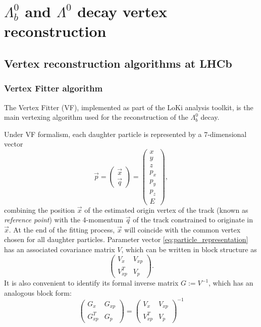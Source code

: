 \chapter{\texorpdfstring{$\Lambda_b^0$}{Lambdab} and \texorpdfstring{$\Lambda^0$}{Lambda} decay vertex reconstruction}
\label{cap:vertex_reconstruction}

\section{Vertex reconstruction algorithms at LHCb}
\subsection{Vertex Fitter algorithm}
The Vertex Fitter (VF), implemented as part of the LoKi analysis toolkit, is the main vertexing algorithm used for the reconstruction of the $\Lambda_b^0$ decay.

Under VF formalism, each daughter particle is represented by a 7-dimensional vector
\begin{equation}
	\vec{p} = \begin{pmatrix}
		\vec{x} \\ \vec{q}
	\end{pmatrix}
	=
	\begin{pmatrix}
		x \\ y \\ z \\ p_x \\ p_y \\ p_z \\ E
	\end{pmatrix},
	\label{eq:particle_representation}
\end{equation}
combining the position $\vec{x}$ of the estimated origin vertex of the track (known as \textit{reference point}) with the 4-momentum $\vec{q}$ of the track constrained to originate in $\vec{x}$.
At the end of the fitting process, $\vec{x}$ will coincide with the common vertex chosen for all daughter particles.
Parameter vector \eqref{eq:particle_representation} has an associated covariance matrix $V$, which can be written in block structure as
\begin{equation}
	\begin{pmatrix}
		V_x      & V_{xp} \\
		V_{xp}^T & V_p
	\end{pmatrix}.
\end{equation}
It is also convenient to identify its formal inverse matrix $G := V^{-1}$, which has an analogous block form:
\begin{equation}
	\begin{pmatrix}
		G_x      & G_{xp} \\
		G_{xp}^T & G_p
	\end{pmatrix}
	=
	\begin{pmatrix}
		V_x      & V_{xp} \\
		V_{xp}^T & V_p
	\end{pmatrix}^{-1}
\end{equation}

